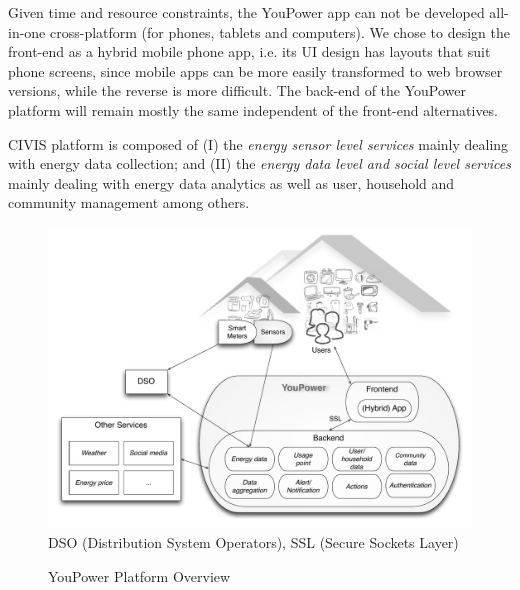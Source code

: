 \noindent Given time and resource constraints, the YouPower app can not be developed all-in-one cross-platform (for phones, tablets and computers). We chose to design the front-end as a hybrid mobile phone app, i.e. its UI design has layouts that suit phone screens, %
since mobile apps can be more easily transformed to web browser versions, while the reverse is more difficult.
The back-end of the YouPower platform will remain mostly the same independent of the front-end alternatives.

CIVIS platform is composed of (I) the \textit{energy sensor level services} mainly
dealing with energy data collection; and (II) the \textit{energy data level and social
level services} mainly dealing with energy data analytics as well as user, household and community management
among others. 

\begin{figure}[h!]
\begin{center}\footnotesize
	\includegraphics[width=1.0\linewidth]{img/civis_platform_overview.pdf}\\
	DSO (Distribution System Operators),  SSL (Secure Sockets Layer)
	\caption{YouPower Platform Overview}\label{fig:platform}
\end{center}
\end{figure}


